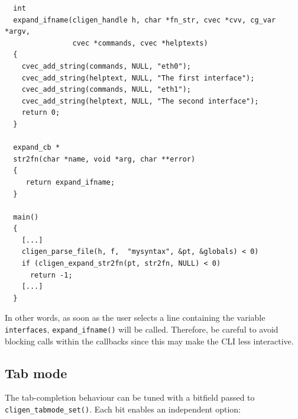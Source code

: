 \documentclass[a4paper, 10pt] {article}
\begin{document}
\begin{verbatim}
  int 
  expand_ifname(cligen_handle h, char *fn_str, cvec *cvv, cg_var *argv, 
                cvec *commands, cvec *helptexts)
  {
    cvec_add_string(commands, NULL, "eth0");
    cvec_add_string(helptext, NULL, "The first interface");
    cvec_add_string(commands, NULL, "eth1");
    cvec_add_string(helptext, NULL, "The second interface");
    return 0;
  }

  expand_cb *
  str2fn(char *name, void *arg, char **error)
  {
     return expand_ifname;
  }

  main()
  {   
    [...]
    cligen_parse_file(h, f,  "mysyntax", &pt, &globals) < 0)
    if (cligen_expand_str2fn(pt, str2fn, NULL) < 0)
      return -1;
    [...]
  }
\end{verbatim}

In other words, as soon as the user selects a line containing the
variable {\tt interfaces}, {\tt expand\_ifname()} will be
called. Therefore, be careful to avoid blocking calls within the
callbacks since this may make the CLI less interactive.

\subsection{Tab mode}
\label{sec:tabmode}

The tab-completion behaviour can be tuned with a bitfield passed to
{\tt cligen\_tabmode\_set()}.  Each bit enables an independent option:
\end{document}
